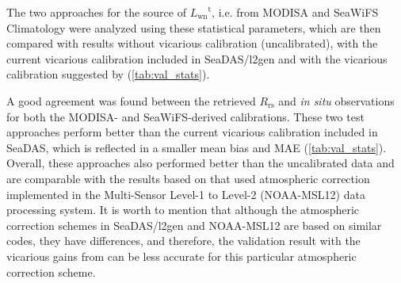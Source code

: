 \documentclass[]{interact}
\theoremstyle{plain}%
\theoremstyle{definition}
\theoremstyle{remark}
\begin{document}
The two approaches for the source of ${L_\text{wn}}^\text{t}$, i.e. from MODISA and SeaWiFS Climatology were analyzed using these statistical parameters, which are then compared with results without vicarious calibration (uncalibrated), with the current vicarious calibration included in SeaDAS/l2gen and with the vicarious calibration suggested by \cite{Wang:13} (\autoref{tab:val_stats}).

A good agreement was found between the retrieved $R_\text{rs}$ and {\it in situ} observations for both the MODISA- and SeaWiFS-derived calibrations. These two test approaches perform better than the current vicarious calibration included in SeaDAS, which is reflected in a smaller mean bias and MAE (\autoref{tab:val_stats}). Overall, these approaches also performed better than the uncalibrated data and are comparable with the results based on \cite{Wang:13} that used atmospheric correction implemented in the Multi-Sensor Level-1 to Level-2 (NOAA-MSL12) data processing system. It is worth to mention that although the atmospheric correction schemes in SeaDAS/l2gen and NOAA-MSL12 are based on similar codes, they have differences, and therefore, the validation result with the vicarious gains from \cite{Wang:13} can be less accurate for this particular atmospheric correction scheme.
\end{document}
